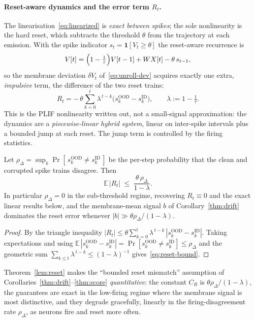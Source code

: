 ﻿\documentclass{article} %
\theoremstyle{remark}
\begin{document}
\paragraph{Reset-aware dynamics and the error term $R_t$.} The linearisation~\eqref{eq:linearized} is
\emph{exact between spikes}; the sole nonlinearity is the hard reset, which subtracts the threshold
$\theta$ from the trajectory at each emission. With the spike indicator $s_t=\mathbf{1}[V_t\ge\theta]$
the reset-aware recurrence is
\begin{equation}
  V[t] = \Bigl(1-\tfrac1\tau\Bigr)V[t-1] + WX[t] - \theta\, s_{t-1},
  \label{eq:reset-recurrence}
\end{equation}
so the membrane deviation $\delta V_t$ of~\eqref{eq:unroll-dev} acquires exactly one extra,
\emph{impulsive} term, the difference of the two reset trains:
\begin{equation}
  R_t = -\,\theta\sum_{k=0}^{t}\lambda^{\,t-k}\bigl(s_k^{\mathrm{OOD}}-s_k^{\mathrm{ID}}\bigr),
  \qquad \lambda := 1-\tfrac1\tau .
  \label{eq:reset-term}
\end{equation}
This is the PLIF nonlinearity written out, not a small-signal approximation: the dynamics are a
\emph{piecewise-linear hybrid system}, linear on inter-spike intervals plus a bounded jump at each
reset. The jump term is controlled by the firing statistics.
\begin{theorem}
\label{lem:reset}
Let $\rho_\Delta=\sup_k\Pr[\,s_k^{\mathrm{OOD}}\neq s_k^{\mathrm{ID}}\,]$ be the per-step probability
that the clean and corrupted spike trains disagree. Then
\begin{equation}
  \mathbb{E}\,|R_t|\;\le\;\frac{\theta\,\rho_\Delta}{1-\lambda}.
  \label{eq:reset-bound}
\end{equation}
In particular $\rho_\Delta=0$ in the sub-threshold regime, recovering $R_t\equiv0$ and the exact
linear results below, and the membrane-mean signal $b$ of Corollary~\ref{thm:drift} dominates the reset
error whenever $|b|\gg\theta\rho_\Delta/(1-\lambda)$.
\end{theorem}
\begin{proof}
By the triangle inequality $|R_t|\le\theta\sum_{k=0}^{t}\lambda^{\,t-k}\,|s_k^{\mathrm{OOD}}-s_k^{\mathrm{ID}}|$.
Taking expectations and using $\mathbb{E}\,|s_k^{\mathrm{OOD}}-s_k^{\mathrm{ID}}|
=\Pr[s_k^{\mathrm{OOD}}\neq s_k^{\mathrm{ID}}]\le\rho_\Delta$ and the geometric sum
$\sum_{k\le t}\lambda^{\,t-k}\le(1-\lambda)^{-1}$ gives~\eqref{eq:reset-bound}.
\end{proof}
\noindent Theorem~\ref{lem:reset} makes the ``bounded reset mismatch'' assumption of
Corollaries~\ref{thm:drift}--\ref{thm:score} \emph{quantitative}: the constant $C_R$ is
$\theta\rho_\Delta/(1-\lambda)$, the guarantees are exact in the low-firing regime where the membrane
signal is most distinctive, and they degrade gracefully, linearly in the firing-disagreement rate
$\rho_\Delta$, as neurons fire and reset more often.
\end{document}
